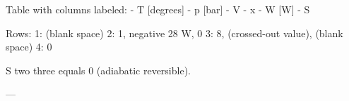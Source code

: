 Table with columns labeled:  
- T [degrees]  
- p [bar]  
- V  
- x  
- W [W]  
- S  

Rows:  
1: (blank space)  
2: 1, negative 28 W, 0  
3: 8, (crossed-out value), (blank space)  
4: 0  

S two three equals 0 (adiabatic reversible).  

---